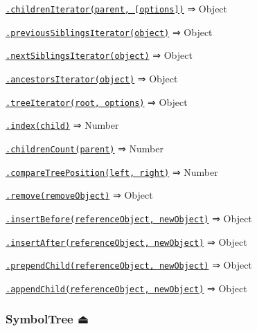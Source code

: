 \begin{DoxyItemize}
\begin{DoxyItemize}
\begin{DoxyItemize}
\item \href{#module_symbol-tree--SymbolTree+childrenIterator}{\tt .children\+Iterator(parent, \mbox{[}options\mbox{]})} ⇒ {\ttfamily Object}
\item \href{#module_symbol-tree--SymbolTree+previousSiblingsIterator}{\tt .previous\+Siblings\+Iterator(object)} ⇒ {\ttfamily Object}
\item \href{#module_symbol-tree--SymbolTree+nextSiblingsIterator}{\tt .next\+Siblings\+Iterator(object)} ⇒ {\ttfamily Object}
\item \href{#module_symbol-tree--SymbolTree+ancestorsIterator}{\tt .ancestors\+Iterator(object)} ⇒ {\ttfamily Object}
\item \href{#module_symbol-tree--SymbolTree+treeIterator}{\tt .tree\+Iterator(root, options)} ⇒ {\ttfamily Object}
\item \href{#module_symbol-tree--SymbolTree+index}{\tt .index(child)} ⇒ {\ttfamily Number}
\item \href{#module_symbol-tree--SymbolTree+childrenCount}{\tt .children\+Count(parent)} ⇒ {\ttfamily Number}
\item \href{#module_symbol-tree--SymbolTree+compareTreePosition}{\tt .compare\+Tree\+Position(left, right)} ⇒ {\ttfamily Number}
\item \href{#module_symbol-tree--SymbolTree+remove}{\tt .remove(remove\+Object)} ⇒ {\ttfamily Object}
\item \href{#module_symbol-tree--SymbolTree+insertBefore}{\tt .insert\+Before(reference\+Object, new\+Object)} ⇒ {\ttfamily Object}
\item \href{#module_symbol-tree--SymbolTree+insertAfter}{\tt .insert\+After(reference\+Object, new\+Object)} ⇒ {\ttfamily Object}
\item \href{#module_symbol-tree--SymbolTree+prependChild}{\tt .prepend\+Child(reference\+Object, new\+Object)} ⇒ {\ttfamily Object}
\item \href{#module_symbol-tree--SymbolTree+appendChild}{\tt .append\+Child(reference\+Object, new\+Object)} ⇒ {\ttfamily Object}
\end{DoxyItemize}
\end{DoxyItemize}
\end{DoxyItemize}

\label{_exp_module_symbol-tree--SymbolTree}%


\subsubsection*{Symbol\+Tree ⏏}

